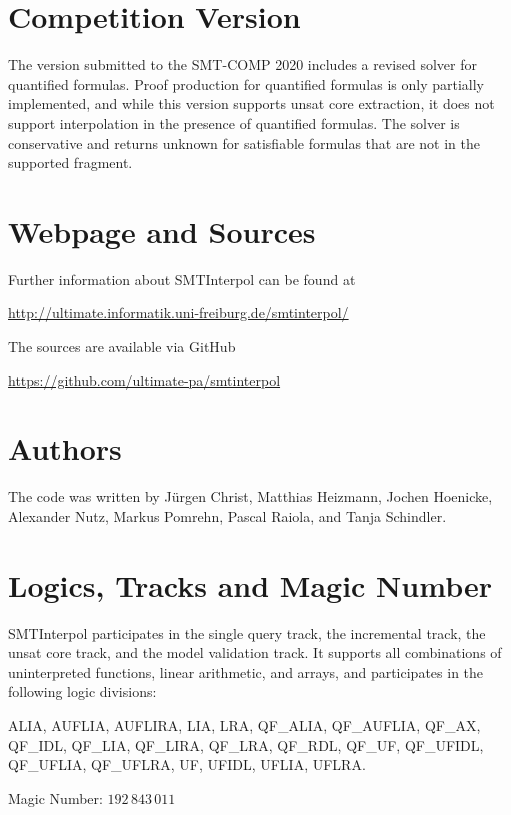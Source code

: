 \documentclass[a4paper]{easychair}
\newcommand\SI{SMTInterpol\xspace}
\begin{document}
\section*{Competition Version}
The version submitted to the SMT-COMP 2020 includes a revised solver for quantified formulas.
Proof production for quantified formulas is only partially implemented, and while this version supports unsat core extraction, it does not support interpolation in the presence of quantified formulas.
The solver is conservative and returns unknown for satisfiable formulas that are not in the supported fragment.

\section*{Webpage and Sources}
Further information about \SI can be found at
\begin{center}
  \url{http://ultimate.informatik.uni-freiburg.de/smtinterpol/}
\end{center}
The sources are available via GitHub
\begin{center}
  \url{https://github.com/ultimate-pa/smtinterpol}
\end{center}

\section*{Authors}
The code was written by J{\"u}rgen Christ, Matthias Heizmann, Jochen Hoenicke, Alexander Nutz, 
Markus Pomrehn, Pascal Raiola, and Tanja Schindler.

\section*{Logics, Tracks and Magic Number}

\SI participates in the single query track, the incremental track, the unsat core track, and the model validation track.
It supports all combinations of uninterpreted functions, linear arithmetic, and arrays, and participates in the following logic divisions:

ALIA, AUFLIA, AUFLIRA, LIA, LRA, QF\_ALIA, QF\_AUFLIA, QF\_AX,
QF\_IDL, QF\_LIA, QF\_LIRA, QF\_LRA, QF\_RDL, QF\_UF, QF\_UFIDL,
QF\_UFLIA, QF\_UFLRA, UF, UFIDL, UFLIA, UFLRA.

Magic Number: $192\,843\,011$



\end{document}
